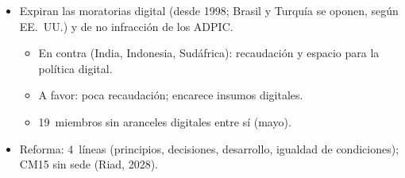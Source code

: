 \documentclass{article}
\begin{document}
\begin{columnas}
\begin{itemize}
\item Expiran las moratorias digital (desde 1998; Brasil y Turquía se oponen, según EE.~UU.) y de no infracción de los ADPIC.
  \begin{itemize}
  \item En contra (India, Indonesia, Sudáfrica): recaudación y espacio para la política digital.
  \item A favor: poca recaudación; encarece insumos digitales.
  \item 19~miembros sin aranceles digitales entre sí (mayo).
  \end{itemize}
\item Reforma: 4~líneas (principios, decisiones, desarrollo, igualdad de condiciones); CM15 sin sede (Riad, 2028).
\end{itemize}


\end{columnas}
\end{document}
